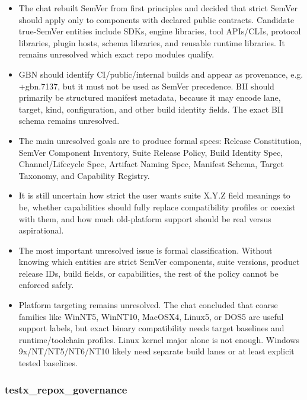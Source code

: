 \documentclass[11pt,a4paper]{report}
\begin{document}
\begin{itemize}
\item The chat rebuilt SemVer from first principles and decided that strict SemVer should apply only to components with declared public contracts. Candidate true-SemVer entities include SDKs, engine libraries, tool APIs/CLIs, protocol libraries, plugin hosts, schema libraries, and reusable runtime libraries. It remains unresolved which exact repo modules qualify.
\item GBN should identify CI/public/internal builds and appear as provenance, e.g. +gbn.7137, but it must not be used as SemVer precedence. BII should primarily be structured manifest metadata, because it may encode lane, target, kind, configuration, and other build identity fields. The exact BII schema remains unresolved.
\item The main unresolved goals are to produce formal specs: Release Constitution, SemVer Component Inventory, Suite Release Policy, Build Identity Spec, Channel/Lifecycle Spec, Artifact Naming Spec, Manifest Schema, Target Taxonomy, and Capability Registry.
\item It is still uncertain how strict the user wants suite X.Y.Z field meanings to be, whether capabilities should fully replace compatibility profiles or coexist with them, and how much old-platform support should be real versus aspirational.
\item The most important unresolved issue is formal classification. Without knowing which entities are strict SemVer components, suite versions, product release IDs, build fields, or capabilities, the rest of the policy cannot be enforced safely.
\item Platform targeting remains unresolved. The chat concluded that coarse families like WinNT5, WinNT10, MacOSX4, Linux5, or DOS5 are useful support labels, but exact binary compatibility needs target baselines and runtime/toolchain profiles. Linux kernel major alone is not enough. Windows 9x/NT/NT5/NT6/NT10 likely need separate build lanes or at least explicit tested baselines.
\end{itemize}

\subsubsection{testx\_repox\_governance}
\end{document}
